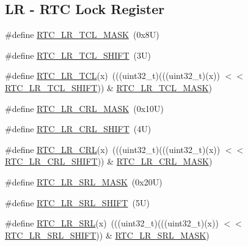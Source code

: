 \subsection*{LR -\/ R\+TC Lock Register}
\begin{DoxyCompactItemize}
\item 
\#define \mbox{\hyperlink{group___r_t_c___register___masks_ga89f5d0ce94e7eb13bd961774fd440c0b}{R\+T\+C\+\_\+\+L\+R\+\_\+\+T\+C\+L\+\_\+\+M\+A\+SK}}~(0x8\+U)
\item 
\#define \mbox{\hyperlink{group___r_t_c___register___masks_ga3f1532cd2a9c7b767e2363ddde7777c4}{R\+T\+C\+\_\+\+L\+R\+\_\+\+T\+C\+L\+\_\+\+S\+H\+I\+FT}}~(3\+U)
\item 
\#define \mbox{\hyperlink{group___r_t_c___register___masks_ga62e9dbab511a4f727dd4674932501fee}{R\+T\+C\+\_\+\+L\+R\+\_\+\+T\+CL}}(x)~(((uint32\+\_\+t)(((uint32\+\_\+t)(x)) $<$$<$ \mbox{\hyperlink{group___r_t_c___register___masks_ga3f1532cd2a9c7b767e2363ddde7777c4}{R\+T\+C\+\_\+\+L\+R\+\_\+\+T\+C\+L\+\_\+\+S\+H\+I\+FT}})) \& \mbox{\hyperlink{group___r_t_c___register___masks_ga89f5d0ce94e7eb13bd961774fd440c0b}{R\+T\+C\+\_\+\+L\+R\+\_\+\+T\+C\+L\+\_\+\+M\+A\+SK}})
\item 
\#define \mbox{\hyperlink{group___r_t_c___register___masks_ga79d7286374cccca93261d4ced777c2e7}{R\+T\+C\+\_\+\+L\+R\+\_\+\+C\+R\+L\+\_\+\+M\+A\+SK}}~(0x10\+U)
\item 
\#define \mbox{\hyperlink{group___r_t_c___register___masks_ga170e66be6136b04cac5df94c81675cc5}{R\+T\+C\+\_\+\+L\+R\+\_\+\+C\+R\+L\+\_\+\+S\+H\+I\+FT}}~(4\+U)
\item 
\#define \mbox{\hyperlink{group___r_t_c___register___masks_ga1a502847fc337b81764e45ee3bfd06d4}{R\+T\+C\+\_\+\+L\+R\+\_\+\+C\+RL}}(x)~(((uint32\+\_\+t)(((uint32\+\_\+t)(x)) $<$$<$ \mbox{\hyperlink{group___r_t_c___register___masks_ga170e66be6136b04cac5df94c81675cc5}{R\+T\+C\+\_\+\+L\+R\+\_\+\+C\+R\+L\+\_\+\+S\+H\+I\+FT}})) \& \mbox{\hyperlink{group___r_t_c___register___masks_ga79d7286374cccca93261d4ced777c2e7}{R\+T\+C\+\_\+\+L\+R\+\_\+\+C\+R\+L\+\_\+\+M\+A\+SK}})
\item 
\#define \mbox{\hyperlink{group___r_t_c___register___masks_ga0681f481e213872418c16d5e012e5603}{R\+T\+C\+\_\+\+L\+R\+\_\+\+S\+R\+L\+\_\+\+M\+A\+SK}}~(0x20\+U)
\item 
\#define \mbox{\hyperlink{group___r_t_c___register___masks_ga33823f8e5a5e100db14493426af60d67}{R\+T\+C\+\_\+\+L\+R\+\_\+\+S\+R\+L\+\_\+\+S\+H\+I\+FT}}~(5\+U)
\item 
\#define \mbox{\hyperlink{group___r_t_c___register___masks_ga22b30e792eed5423fdf1c23a28964d1a}{R\+T\+C\+\_\+\+L\+R\+\_\+\+S\+RL}}(x)~(((uint32\+\_\+t)(((uint32\+\_\+t)(x)) $<$$<$ \mbox{\hyperlink{group___r_t_c___register___masks_ga33823f8e5a5e100db14493426af60d67}{R\+T\+C\+\_\+\+L\+R\+\_\+\+S\+R\+L\+\_\+\+S\+H\+I\+FT}})) \& \mbox{\hyperlink{group___r_t_c___register___masks_ga0681f481e213872418c16d5e012e5603}{R\+T\+C\+\_\+\+L\+R\+\_\+\+S\+R\+L\+\_\+\+M\+A\+SK}})
$$
\end{DoxyCompactItemize}
